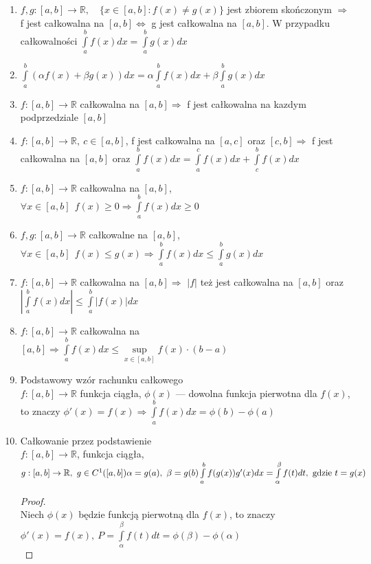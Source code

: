 \documentclass[12pt,a4paper]{article}
\theoremstyle{definition}
\begin{document}
\begin{enumerate}
\item $f,g: [a,b] \to \mathbb{R}, \quad\{x\in[a,b]: f(x) \neq g(x)\}$ jest zbiorem skończonym $\Rightarrow$ f jest całkowalna na $[a,b]\Leftrightarrow$ g jest całkowalna na $[a,b]$. W przypadku całkowalności $\int\limits_a^bf(x)dx=\int\limits_a^bg(x)dx$
\item $ \int\limits_{a}^{b} (\alpha f(x) + \beta g(x))dx = \alpha \int\limits_a^b f(x)dx + \beta \int\limits_a^bg(x)dx $
\item $f: [a,b]\to\mathbb{R}$ całkowalna na $[a,b] \Rightarrow$ f jest całkowalna na kazdym podprzedziale $[a,b]$
\item $f: [a,b]\to\mathbb{R}, ~ c\in [a,b]$, f jest całkowalna na $[a,c]$ oraz $[c,b] \Rightarrow$ f jest całkowalna na $[a,b]$ oraz $\int\limits_a^bf(x)dx = \int\limits_a^cf(x)dx + \int\limits_c^bf(x)dx$
\item $f: [a,b] \to \mathbb{R}$ całkowalna na $[a,b]$, $\forall x\in[a,b] ~~ f(x) \geq 0 \Rightarrow \int\limits_a^bf(x)dx \geq 0$
\item $f,g: [a,b] \to \mathbb{R}$ całkowalne na $[a,b]$, $\forall x\in[a,b] ~~ f(x) \leq g(x) \Rightarrow \int\limits_a^bf(x)dx \leq \int\limits_a^bg(x)dx$
\item $f: [a,b] \to \mathbb{R}$ całkowalna na $[a,b] \Rightarrow$ $|f|$ też jest całkowalna na $[a,b]$ oraz $|\int\limits_a^bf(x)dx| \leq \int\limits_a^b|f(x)|dx$
\item $f: [a,b] \to \mathbb{R}$ całkowalna na $[a,b] \Rightarrow \int\limits_a^bf(x)dx \leq \sup\limits_{x\in[a,b]}f(x)\cdot(b-a)$
\item Podstawowy wzór rachunku całkowego\\
$f: [a,b] \to \mathbb{R}$ funkcja ciągła, $\phi(x)$ --- dowolna funkcja pierwotna dla $f(x)$, to znaczy $\phi'(x)=f(x) \Rightarrow \int\limits_a^bf(x)dx = \phi(b)-\phi(a)$
\item Całkowanie przez podstawienie\\
$
f: [a,b]\to\mathbb{R}$, funkcja ciągła, $g: [a,b]\to\mathbb{R},~ g\in C^1([a,b])\\
\alpha = g(a),~ \beta =g(b)\\
\int\limits_a^bf(g(x))g'(x)dx = \int\limits_\alpha^\beta f(t)dt, \text{ gdzie }t = g(x)
$
\begin{proof}~\\
	Niech $\phi(x)$ będzie funkcją pierwotną dla $f(x)$, to znaczy
	 $\phi'(x) = f(x), ~ P=\int\limits_\alpha^\beta f(t)dt = \phi(\beta)-\phi(\alpha)$\\

\end{proof}
\end{enumerate}
\end{document}
